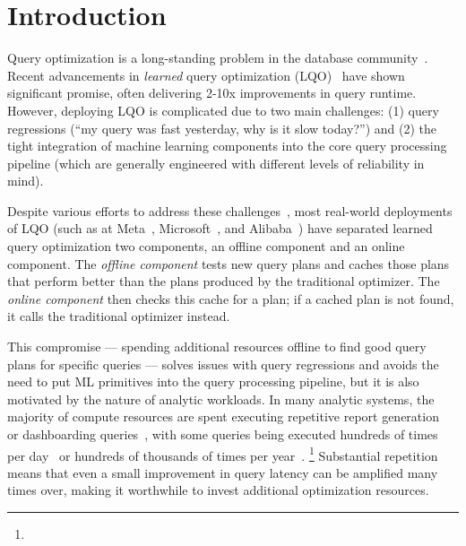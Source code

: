 
\section{Introduction}

Query optimization is a long-standing problem in the database community~\cite{system_r,howgood,qo_unsolved}. Recent advancements in \emph{learned} query optimization (LQO)~\cite{balsa,lero,roq,loger,hybrid_lqo,lstm_jo,qo_state_rep,rejoin,hero_qo,concurrent_lqo,leon_qo} have shown significant promise, often delivering  2-10x improvements in query runtime. However, deploying LQO is complicated due to two main challenges: (1) query regressions (``my query was fast yesterday, why is it slow today?'') and (2) the tight integration of machine learning components into the core query processing pipeline (which are generally engineered with different levels of reliability in mind).

Despite various efforts to address these challenges~\cite{bao,fastgres}, most real-world deployments of LQO (such as at Meta~\cite{autosteer}, Microsoft~\cite{bao_scope, bao_scope2}, and Alibaba~\cite{eraser_lqo,pilotscope}) have separated learned query optimization two components, an offline component and an online component. The \emph{offline component} tests new query plans and caches those plans that perform better than the plans produced by the traditional optimizer. The \emph{online component} then checks this cache for a plan; if a cached plan is not found, it calls the traditional optimizer instead.

This compromise --- spending additional resources offline to find good query plans for specific queries --- solves issues with query regressions and avoids the need to put ML primitives into the query processing pipeline, but it is also motivated by the nature of analytic workloads. In many analytic systems, the majority of compute resources are spent executing repetitive report generation~\cite{superopt_vision} or dashboarding queries~\cite{redshift_pred_cache}, with some queries being executed hundreds of times per day~\cite{stage} or hundreds of thousands of times per year~\cite{superopt_vision}.  \footnote{} Substantial repetition means that even a small improvement in query latency can be amplified many times over, making it worthwhile to invest additional optimization resources.

